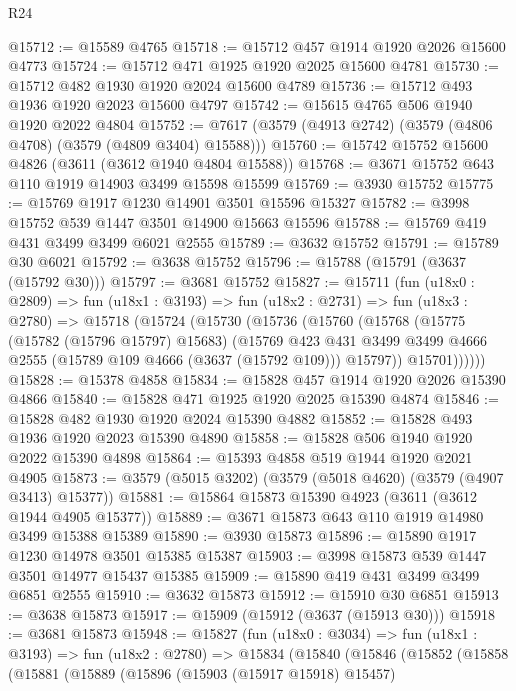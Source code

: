 \begin{lexlean}{R24}
\begin{coremodule}
@15712 := @15589 @4765
@15718 := @15712 @457 @1914 @1920 @2026 @15600 @4773
@15724 := @15712 @471 @1925 @1920 @2025 @15600 @4781
@15730 := @15712 @482 @1930 @1920 @2024 @15600 @4789
@15736 := @15712 @493 @1936 @1920 @2023 @15600 @4797
@15742 := @15615 @4765 @506 @1940 @1920 @2022 @4804
@15752 := @7617 (@3579 (@4913 @2742) (@3579 (@4806 @4708) (@3579 (@4809 @3404) @15588)))
@15760 := @15742 @15752 @15600 @4826 (@3611 (@3612 @1940 @4804 @15588))
@15768 := @3671 @15752 @643 @110 @1919 @14903 @3499 @15598 @15599
@15769 := @3930 @15752
@15775 := @15769 @1917 @1230 @14901 @3501 @15596 @15327
@15782 := @3998 @15752 @539 @1447 @3501 @14900 @15663 @15596
@15788 := @15769 @419 @431 @3499 @3499 @6021 @2555
@15789 := @3632 @15752
@15791 := @15789 @30 @6021
@15792 := @3638 @15752
@15796 := @15788 (@15791 (@3637 (@15792 @30)))
@15797 := @3681 @15752
@15827 := @15711
    (fun (u18x0 : @2809) =>
    fun (u18x1 : @3193) =>
    fun (u18x2 : @2731) =>
    fun (u18x3 : @2780) =>
    @15718
      (@15724
        (@15730
          (@15736
            (@15760
              (@15768
                (@15775
                  (@15782 (@15796 @15797) @15683)
                  (@15769
                    @423
                    @431
                    @3499
                    @3499
                    @4666
                    @2555
                    (@15789 @109 @4666 (@3637 (@15792 @109)))
                    @15797))
                @15701))))))
@15828 := @15378 @4858
@15834 := @15828 @457 @1914 @1920 @2026 @15390 @4866
@15840 := @15828 @471 @1925 @1920 @2025 @15390 @4874
@15846 := @15828 @482 @1930 @1920 @2024 @15390 @4882
@15852 := @15828 @493 @1936 @1920 @2023 @15390 @4890
@15858 := @15828 @506 @1940 @1920 @2022 @15390 @4898
@15864 := @15393 @4858 @519 @1944 @1920 @2021 @4905
@15873 := @3579 (@5015 @3202) (@3579 (@5018 @4620) (@3579 (@4907 @3413) @15377))
@15881 := @15864 @15873 @15390 @4923 (@3611 (@3612 @1944 @4905 @15377))
@15889 := @3671 @15873 @643 @110 @1919 @14980 @3499 @15388 @15389
@15890 := @3930 @15873
@15896 := @15890 @1917 @1230 @14978 @3501 @15385 @15387
@15903 := @3998 @15873 @539 @1447 @3501 @14977 @15437 @15385
@15909 := @15890 @419 @431 @3499 @3499 @6851 @2555
@15910 := @3632 @15873
@15912 := @15910 @30 @6851
@15913 := @3638 @15873
@15917 := @15909 (@15912 (@3637 (@15913 @30)))
@15918 := @3681 @15873
@15948 := @15827
    (fun (u18x0 : @3034) =>
    fun (u18x1 : @3193) =>
    fun (u18x2 : @2780) =>
    @15834
      (@15840
        (@15846
          (@15852
            (@15858
              (@15881
                (@15889
                  (@15896
                    (@15903 (@15917 @15918) @15457)

\end{coremodule}
\end{lexlean}
